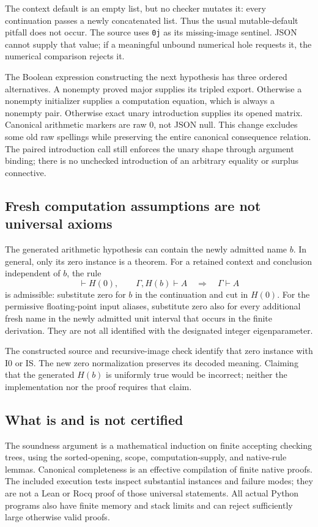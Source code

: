 \documentclass[11pt,letterpaper]{article}
\theoremstyle{definition}\newtheorem{definition}[theorem]{Definition}
\theoremstyle{remark}\newtheorem{remark}[theorem]{Remark}
\begin{document}
The context default is an empty list, but no checker mutates it: every
continuation passes a newly concatenated list. Thus the usual mutable-default
pitfall does not occur. The source uses \texttt{0j} as its missing-image
sentinel. JSON cannot supply that value; if a meaningful unbound numerical
hole requests it, the numerical comparison rejects it.

The Boolean expression constructing the next hypothesis has three ordered
alternatives. A nonempty proved major supplies its tripled export.
Otherwise a nonempty initializer supplies a computation equation, which is
always a nonempty pair. Otherwise exact unary introduction supplies its
opened matrix. Canonical arithmetic markers are raw $0$, not JSON null.
This change excludes some old raw spellings while preserving the entire
canonical consequence relation. The paired introduction call still enforces
the unary shape through argument binding; there is no unchecked introduction
of an arbitrary equality or surplus connective.

\subsection{Fresh computation assumptions are not universal axioms}

The generated arithmetic hypothesis can contain the newly admitted name
$b$. In general, only its zero instance is a theorem. For a retained
context and conclusion independent of $b$, the rule
\[
 \vdash H(0),\qquad \Gamma,H(b)\vdash A
 \quad\Longrightarrow\quad \Gamma\vdash A
\]
is admissible: substitute zero for $b$ in the continuation and cut in
$H(0)$. For the permissive floating-point input aliases, substitute zero
also for every additional fresh name in the newly admitted unit interval
that occurs in the finite derivation. They are not all identified with
the designated integer eigenparameter.

The constructed source and recursive-image check identify that zero
instance with I0 or IS. The new zero normalization preserves its decoded
meaning. Claiming that the generated $H(b)$ is uniformly true would be
incorrect; neither the implementation nor the proof requires that claim.

\subsection{What is and is not certified}

The soundness argument is a mathematical induction on finite accepting
checking trees, using the sorted-opening, scope, computation-supply, and
native-rule lemmas. Canonical completeness is an effective compilation
of finite native proofs. The included execution tests inspect substantial
instances and failure modes; they are not a Lean or Rocq proof of those
universal statements. All actual Python programs also have finite memory
and stack limits and can reject sufficiently large otherwise valid proofs.
\end{document}
